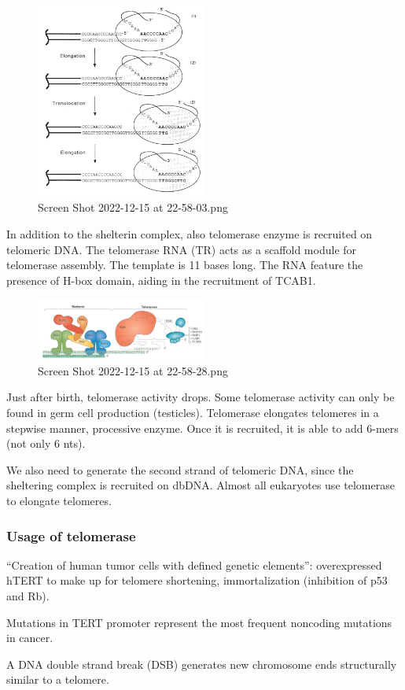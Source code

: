 \begin{figure}
\centering
\includegraphics[width=0.5\textwidth]{../_resources/Screen_Shot_2022-12-15_at_22-58-03.png}
\caption{Screen Shot 2022-12-15 at 22-58-03.png}
\end{figure}

In addition to the shelterin complex, also telomerase enzyme is
recruited on telomeric DNA. The telomerase RNA (TR) acts as a scaffold
module for telomerase assembly. The template is 11 bases long. The RNA
feature the presence of H-box domain, aiding in the recruitment of
TCAB1.

\begin{figure}
\centering
\includegraphics[width=0.5\textwidth]{../_resources/Screen_Shot_2022-12-15_at_22-58-28.png}
\caption{Screen Shot 2022-12-15 at 22-58-28.png}
\end{figure}


Just after birth, telomerase activity drops. Some telomerase activity
can only be found in germ cell production (testicles). Telomerase
elongates telomeres in a stepwise manner, processive enzyme. Once it is
recruited, it is able to add 6-mers (not only 6 nts).

We also need to generate the second strand of telomeric DNA, since the
sheltering complex is recruited on dbDNA. Almost all eukaryotes use
telomerase to elongate telomeres.

\hypertarget{usage-of-telomerase}{%
\subsubsection{Usage of telomerase}\label{usage-of-telomerase}}

``Creation of human tumor cells with defined genetic elements'':
overexpressed hTERT to make up for telomere shortening, immortalization
(inhibition of p53 and Rb).

Mutations in TERT promoter represent the most frequent noncoding
mutations in cancer.

A DNA double strand break (DSB) generates new chromosome ends
structurally similar to a telomere.
